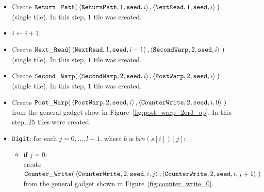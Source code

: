 \begin{itemize}
    \item Create
    $\begin{aligned}[t]
            {\tt Return\_Path}(&\left\langle {\tt ReturnPath}, 1, {\tt seed}, i \right\rangle,
                         \left\langle {\tt NextRead},   1, {\tt seed}, i \right\rangle \;)
    \end{aligned}$\\ (single tile).
    In this step, $1$ tile was created.

    \item $i \gets i + 1$.

    \item Create
    $\begin{aligned}[t]
            {\tt Next\_Read}(&\left\langle {\tt NextRead},   1, {\tt seed}, i - 1\right\rangle,
                       \left\langle {\tt SecondWarp}, 2, {\tt seed}, i    \right\rangle \;)
    \end{aligned}$\\ (single tile).
    In this step, $1$ tile was created.

    \item Create
    $\begin{aligned}[t]
        {\tt Second\_Warp}(&\left\langle {\tt SecondWarp}, 2, {\tt seed}, i \right\rangle,
                     \left\langle {\tt PostWarp},   2, {\tt seed}, i \right\rangle \;)
    \end{aligned}$ (single tile).
    In this step, $1$ tile was created.

    \item Create
    $\begin{aligned}[t]
        {\tt Post\_Warp}(&\left\langle {\tt PostWarp},     2, {\tt seed}, i    \right\rangle,
                   \left\langle {\tt CounterWrite}, 2, {\tt seed}, i, 0 \right\rangle \;)
    \end{aligned}$\\ from the general gadget show in Figure~\ref{fig:post_warp_2or3_op}.
    In this step, $25$ tiles were created.

    \item {\tt Digit}: for each $j=0,\ldots,l-1$, where $b$ is $bin(s[i])[j]$:
    \begin{itemize}
        \item if $j = 0$:\\ create
        $\begin{aligned}[t]
            {\tt Counter\_Write}(&\left\langle {\tt CounterWrite}, 2, {\tt seed}, i, j \right\rangle, \left\langle {\tt CounterWrite}, 2, {\tt seed}, i, j + 1 \right\rangle \;)
        \end{aligned}$\\from the general gadget shown in Figure~\ref{fig:counter_write_0}.


\end{itemize}
\end{itemize}
